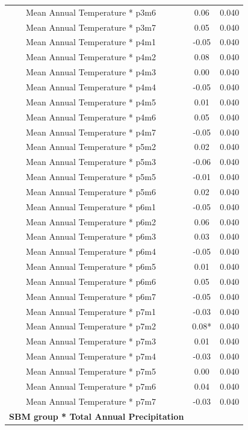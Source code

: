 \documentclass[
]{agujournal2019}
\begin{document}
\begin{longtable*}{lcc}
    Mean Annual Temperature * p3m6 & 0.06 & 0.040 \\ 
    Mean Annual Temperature * p3m7 & 0.05 & 0.040 \\ 
    Mean Annual Temperature * p4m1 & -0.05 & 0.040 \\ 
    Mean Annual Temperature * p4m2 & 0.08 & 0.040 \\ 
    Mean Annual Temperature * p4m3 & 0.00 & 0.040 \\ 
    Mean Annual Temperature * p4m4 & -0.05 & 0.040 \\ 
    Mean Annual Temperature * p4m5 & 0.01 & 0.040 \\ 
    Mean Annual Temperature * p4m6 & 0.05 & 0.040 \\ 
    Mean Annual Temperature * p4m7 & -0.05 & 0.040 \\ 
    Mean Annual Temperature * p5m2 & 0.02 & 0.040 \\ 
    Mean Annual Temperature * p5m3 & -0.06 & 0.040 \\ 
    Mean Annual Temperature * p5m5 & -0.01 & 0.040 \\ 
    Mean Annual Temperature * p5m6 & 0.02 & 0.040 \\ 
    Mean Annual Temperature * p6m1 & -0.05 & 0.040 \\ 
    Mean Annual Temperature * p6m2 & 0.06 & 0.040 \\ 
    Mean Annual Temperature * p6m3 & 0.03 & 0.040 \\ 
    Mean Annual Temperature * p6m4 & -0.05 & 0.040 \\ 
    Mean Annual Temperature * p6m5 & 0.01 & 0.040 \\ 
    Mean Annual Temperature * p6m6 & 0.05 & 0.040 \\ 
    Mean Annual Temperature * p6m7 & -0.05 & 0.040 \\ 
    Mean Annual Temperature * p7m1 & -0.03 & 0.040 \\ 
    Mean Annual Temperature * p7m2 & 0.08* & 0.040 \\ 
    Mean Annual Temperature * p7m3 & 0.01 & 0.040 \\ 
    Mean Annual Temperature * p7m4 & -0.03 & 0.040 \\ 
    Mean Annual Temperature * p7m5 & 0.00 & 0.040 \\ 
    Mean Annual Temperature * p7m6 & 0.04 & 0.040 \\ 
    Mean Annual Temperature * p7m7 & -0.03 & 0.040 \\ 
\textbf{SBM group * Total Annual Precipitation} &  &  \\ 

\end{longtable*}
\end{document}
